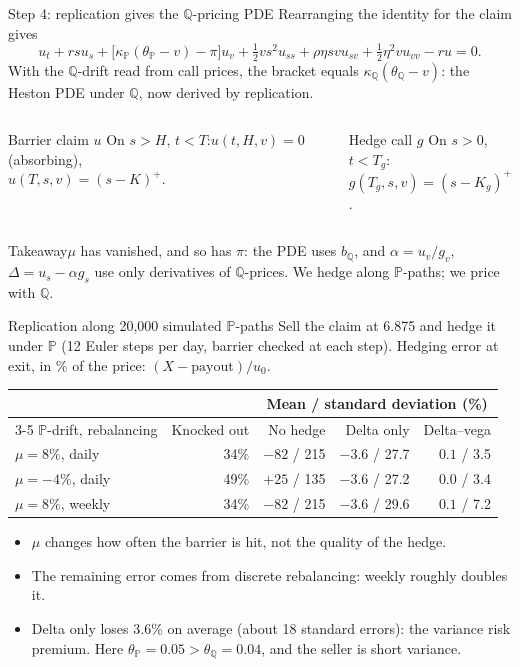 \documentclass[handout,10pt,t,aspectratio=169]{beamer}
\newenvironment{keybox}{\begin{exampleblock}{Takeaway}}{\end{exampleblock}}
\newcommand{\Q}{\mathbb Q}
\newcommand{\Pp}{\mathbb P}
\begin{document}
\begin{frame}{Step 4: replication gives the \(\Q\)-pricing PDE}
\small
Rearranging the identity for the claim gives
\[
u_t+rsu_s+\bigl[\kappa_\Pp(\theta_\Pp-v)-\pi\bigr]u_v
+\tfrac12vs^2u_{ss}+\rho\eta svu_{sv}+\tfrac12\eta^2vu_{vv}-ru=0.
\]
With the \(\Q\)-drift read from call prices, the bracket equals \(\kappa_\Q(\theta_\Q-v)\):
the Heston PDE under \(\Q\), now derived by replication.
\begin{columns}[T,onlytextwidth]
\begin{block}{Barrier claim \(u\)}
On \(s>H\), \(t<T\):\quad \(u(t,H,v)=0\) (absorbing),\\
\(u(T,s,v)=(s-K)^+\).
\end{block}
\begin{block}{Hedge call \(g\)}
On \(s>0\), \(t<T_g\):\\
\(g(T_g,s,v)=(s-K_g)^+\).
\end{block}
\end{columns}
\begin{keybox}\(\mu\) has vanished, and so has \(\pi\): the PDE uses \(b_\Q\), and
\(\alpha=u_v/g_v\), \(\Delta=u_s-\alpha g_s\) use only derivatives of \(\Q\)-prices.
We hedge along \(\Pp\)-paths; we price with \(\Q\).\end{keybox}
\end{frame}





\begin{frame}{Replication along 20{,}000 simulated \(\Pp\)-paths}
\small
Sell the claim at 6.875 and hedge it under \(\Pp\) (12 Euler steps per day, barrier
checked at each step). Hedging error at exit, in \% of the price: \((X-\text{payout})/u_0\).
\begin{center}
\begin{tabular}{lrrrr}
\toprule & & \multicolumn{3}{c}{Mean / standard deviation (\%)}\\\cmidrule(l){3-5}
\(\Pp\)-drift, rebalancing & Knocked out & No hedge & Delta only & Delta--vega\\\midrule
\(\mu=8\%\), daily & 34\% & \(-82\) / 215 & \(-3.6\) / 27.7 & \(0.1\) / 3.5\\
\(\mu=-4\%\), daily & 49\% & \(+25\) / 135 & \(-3.6\) / 27.2 & \(0.0\) / 3.4\\
\(\mu=8\%\), weekly & 34\% & \(-82\) / 215 & \(-3.6\) / 29.6 & \(0.1\) / 7.2\\\bottomrule
\end{tabular}
\end{center}
\begin{itemize}
\item \(\mu\) changes how often the barrier is hit, not the quality of the hedge.
\item The remaining error comes from discrete rebalancing: weekly roughly doubles it.
\item Delta only loses 3.6\% on average (about 18 standard errors): the variance
risk premium. Here \(\theta_\Pp=0.05>\theta_\Q=0.04\), and the seller is short variance.
\end{itemize}
\end{frame}
\end{document}

